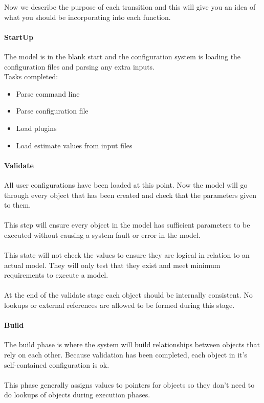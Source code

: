 Now we describe the purpose of each transition and this will give you an idea of what you should be incorporating {\color{red}into} each function.

\paragraph*{StartUp}
The model is in the blank start and the configuration system is loading the configuration files and parsing any extra inputs.
\\
Tasks completed:
\begin{itemize}
	\item Parse command line
	\item Parse configuration file
	\item Load plugins
	\item Load estimate values from input files
\end{itemize}

\paragraph*{Validate}
All user configurations have been loaded at this point. Now the model will go through every object that has been created and check that the parameters given to them.
\\\\
This step will ensure every object in the model has sufficient parameters to be executed without causing a system fault or error in the model.
\\\\
This state will not check the values to ensure they are logical in relation to an actual model. They will only test that they exist and meet minimum requirements to execute a model.
\\\\
At the end of the validate stage each object should be internally consistent. No lookups or external references are allowed to be formed during this stage.

\paragraph*{Build}
The build phase is where the system will build relationships between objects that rely on each other. Because validation has been completed, each object in it's self-contained configuration is ok.
\\\\
This phase generally assigns values to pointers for objects so they don't need to do lookups of objects during execution phases.

